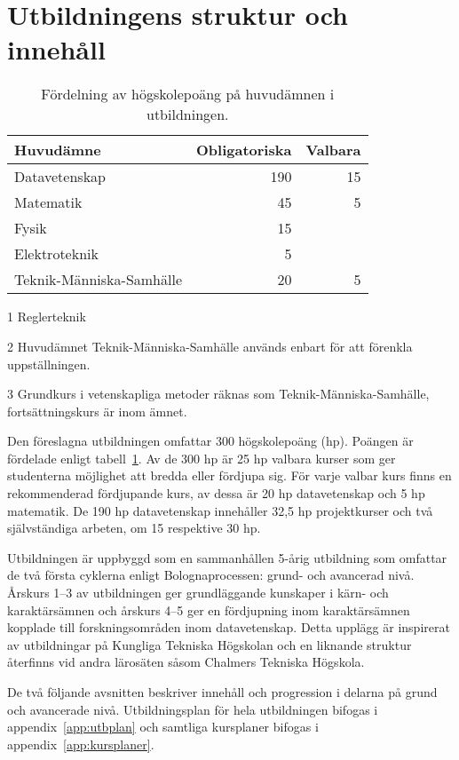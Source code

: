 \section{Utbildningens struktur och innehåll}

\begin{table}[t]
\centering
\caption{Fördelning av högskolepoäng på huvudämnen i utbildningen.\label{tab:poangf}}
\begin{threeparttable}
\begin{tabular}{lrr}
\toprule
\textbf{\textsf{Huvudämne}} & \textbf{\textsf{Obligatoriska}} & \textbf{\textsf{Valbara}} \tabularnewline
\midrule
Datavetenskap & 190 & 15 \tabularnewline
Matematik & 45 & 5\tabularnewline
Fysik & 15 & \tabularnewline
Elektroteknik\tnote{1} & 5 & \tabularnewline
Teknik-Människa-Samhälle\tnote{2,3} & 20 & 5 \tabularnewline
\bottomrule
\end{tabular}
\begin{tablenotes}
\item[1] Reglerteknik
\item[2] Huvudämnet Teknik-Människa-Samhälle används enbart för att förenkla uppställningen.
\item[3] Grundkurs i vetenskapliga metoder räknas som Teknik-Människa-Samhälle, fortsättningskurs är inom ämnet.
\end{tablenotes}
\end{threeparttable}
\end{table}

Den föreslagna utbildningen omfattar 300 högskolepoäng (hp). Poängen är fördelade enligt tabell~\ref{tab:poangf}. Av de 300 hp är 25 hp valbara kurser som ger studenterna möjlighet att bredda eller fördjupa sig. För varje valbar kurs finns en rekommenderad fördjupande kurs, av dessa är 20 hp datavetenskap och 5 hp matematik. De 190 hp datavetenskap innehåller 32,5 hp projektkurser och två självständiga arbeten, om 15 respektive 30 hp.

Utbildningen är uppbyggd som en sammanhållen 5-årig utbildning som omfattar de två första cyklerna enligt Bolognaprocessen: grund- och avancerad nivå. Årskurs 1–3 av utbildningen ger grundläggande kunskaper i kärn- och karaktärsämnen och årskurs 4–5 ger en fördjupning inom karaktärsämnen kopplade till forskningsområden inom datavetenskap. Detta upplägg är inspirerat av utbildningar på Kungliga Tekniska Högskolan och en liknande struktur återfinns vid andra lärosäten såsom Chalmers Tekniska Högskola.

De två följande avsnitten beskriver innehåll och progression i delarna på grund och avancerade nivå. Utbildningsplan för hela utbildningen bifogas i appendix~\ref{app:utbplan} och samtliga kursplaner bifogas i appendix~\ref{app:kursplaner}.

